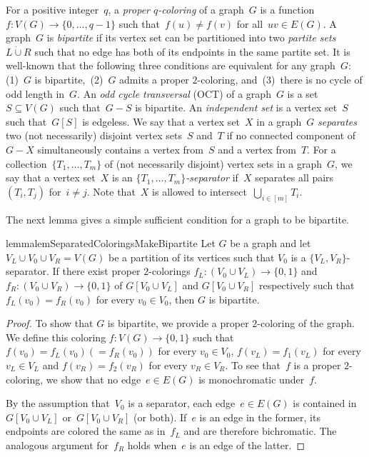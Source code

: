 For a positive integer~$q$, a \emph{proper $q$-coloring} of a graph~$G$ is a function~$f \colon V(G) \to \{0, \ldots, q-1\}$ such that~$f(u) \neq f(v)$ for all~$uv \in E(G)$. A graph~$G$ is \emph{bipartite} if its vertex set can be partitioned into two \emph{partite sets}~$L \dot \cup R$ such that no edge has both of its endpoints in the same partite set. It is well-known that the following three conditions are equivalent for any graph~$G$: (1)~$G$ is bipartite,~(2)~$G$ admits a proper $2$-coloring, and~(3)~there is no cycle of odd length in~$G$. An \emph{odd cycle transversal} (OCT) of a graph~$G$ is a set~$S \subseteq V(G)$ such that~$G - S$ is bipartite. An \emph{independent set} is a vertex set~$S$ such that~$G[S]$ is edgeless. We say that a vertex set~$X$ in a graph~$G$ \emph{separates} two (not necessarily) disjoint vertex sets~$S$ and~$T$ if no connected component of~$G - X$ simultaneously contains a vertex from~$S$ and a vertex from~$T$. For a collection~$\{T_1, \ldots, T_m\}$ of (not necessarily disjoint) vertex sets in a graph~$G$, we say that a vertex set~$X$ is an \emph{$\{T_1, \ldots, T_m\}$-separator} if~$X$ separates all pairs~$(T_i, T_j)$ for~$i \neq j$. Note that~$X$ is allowed to intersect~$\bigcup _{i \in [m]} T_i$.

The next lemma gives a simple sufficient condition for a graph to be bipartite.

\begin{restatable}{lemma}{lemSeparatedColoringsMakeBipartite} \label{lem:separated:colorings:make:bipartite}
	Let $G$ be a graph and let $V_L \cup V_0 \cup V_R = V(G)$ be a partition of its vertices such that $V_0$ is a $\{V_L, V_R\}$-separator. If there exist proper $2$-colorings $f_L: (V_0 \cup V_L) \rightarrow \{0, 1\}$ and $f_R: (V_0 \cup V_R) \rightarrow \{0, 1\}$ of $G[V_0 \cup V_L]$ and $G[V_0 \cup V_R]$ respectively such that $f_L(v_0) = f_R(v_0)$ for every $v_0 \in V_0$, then $G$ is bipartite.
\end{restatable}
\begin{proof}
	To show that $G$ is bipartite, we provide a proper $2$-coloring of the graph. We define this coloring $f \colon V(G) \rightarrow \{0, 1\}$ such that $f(v_0) = f_L(v_0) (= f_R(v_0))$ for every $v_0 \in V_0$, $f(v_L) = f_1(v_L)$ for every $v_L \in V_L$ and $f(v_R) = f_2(v_R)$ for every $v_R \in V_R$. To see that~$f$ is a proper $2$-coloring, we show that no edge~$e \in E(G)$ is monochromatic under~$f$. 
	
	By the assumption that~$V_0$ is a separator, each edge~$e \in E(G)$ is contained in~$G[V_0 \cup V_L]$ or~$G[V_0 \cup V_R]$ (or both). If~$e$ is an edge in the former, its endpoints are colored the same as in~$f_L$ and are therefore bichromatic. The analogous argument for~$f_R$ holds when~$e$ is an edge of the latter.
\end{proof}

